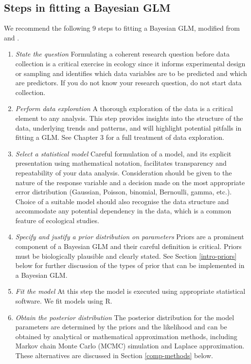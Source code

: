 \documentclass[
]{book}
\begin{document}
\hypertarget{fit-steps}{%
\subsection{Steps in fitting a Bayesian GLM}\label{fit-steps}}

We recommend the following 9 steps to fitting a Bayesian GLM, modified from \citet{Kruschke_2015} and \citet{Zuur_2016}.

\begin{enumerate}
\def\labelenumi{\arabic{enumi}.}
\item
  \emph{State the question}
  Formulating a coherent research question before data collection is a critical exercise in ecology since it informs experimental design or sampling and identifies which data variables are to be predicted and which are predictors. If you do not know your research question, do not start data collection.
\item
  \emph{Perform data exploration}
  A thorough exploration of the data is a critical element to any analysis. This step provides insights into the structure of the data, underlying trends and patterns, and will highlight potential pitfalls in fitting a GLM. See Chapter 3 for a full treatment of data exploration.
\item
  \emph{Select a statistical model}
  Careful formulation of a model, and its explicit presentation using mathematical notation, facilitates transparency and repeatability of your data analysis. Consideration should be given to the nature of the response variable and a decision made on the most appropriate error distribution (Gaussian, Poisson, binomial, Bernoulli, gamma, etc.). Choice of a suitable model should also recognise the data structure and accommodate any potential dependency in the data, which is a common feature of ecological studies.
\item
  \emph{Specify and justify a prior distribution on parameters}
  Priors are a prominent component of a Bayesian GLM and their careful definition is critical. Priors must be biologically plausible and clearly stated. See Section \ref{intro-priors} below for further discussion of the types of prior that can be implemented in a Bayesian GLM.
\item
  \emph{Fit the model}
  At this step the model is executed using appropriate statistical software. We fit models using R.
\item
  \emph{Obtain the posterior distribution}
  The posterior distribution for the model parameters are determined by the priors and the likelihood and can be obtained by analytical or mathematical approximation methods, including Markov chain Monte Carlo (MCMC) simulation and Laplace approximation. These alternatives are discussed in Section \ref{comp-methods} below.

\end{enumerate}
\end{document}
